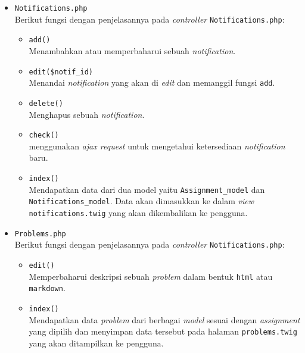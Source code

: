 \begin{itemize}
\begin{itemize}
\begin{itemize}
	      \end{itemize}

	\item \verb|Notifications.php| \\
	      Berikut fungsi dengan penjelasannya pada \textit{controller} \verb|Notifications.php|:

	      \begin{itemize}
		      \item \verb|add()| \\
		            Menambahkan atau memperbaharui sebuah \textit{notification}.
		      \item \verb|edit($notif_id)| \\
		            Menandai \textit{notification} yang akan di \textit{edit} dan memanggil fungsi \verb|add|.
		      \item \verb|delete()| \\
		            Menghapus sebuah \textit{notification}.
		      \item \verb|check()| \\
		            menggunakan \textit{ajax request} untuk mengetahui ketersediaan \textit{notification} baru.
		      \item \verb|index()| \\
		            Mendapatkan data dari dua model yaitu \verb|Assignment_model| dan \verb|Notifications_model|. Data akan dimasukkan ke dalam \textit{view} \verb|notifications.twig| yang akan dikembalikan ke pengguna. 
	      \end{itemize}

	\item \verb|Problems.php| \\
	      Berikut fungsi dengan penjelasannya pada \textit{controller} \verb|Notifications.php|:

	      \begin{itemize}
		      \item \verb|edit()| \\
		            Memperbaharui deskripsi sebuah \textit{problem} dalam bentuk \verb|html| atau \verb|markdown|.
		      \item \verb|index()| \\
		            Mendapatkan data \textit{problem} dari berbagai \textit{model} sesuai dengan \textit{assignment} yang dipilih dan menyimpan data tersebut pada halaman \verb|problems.twig| yang akan ditampilkan ke pengguna. 
	      \end{itemize}


\end{itemize}
\end{itemize}
